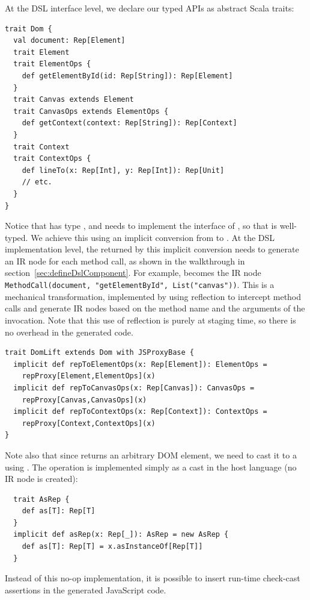 \documentclass[runningheads,a4paper]{llncs}
\begin{document}
At the DSL interface level, we declare our typed APIs as abstract
Scala traits:
\begin{lstlisting}
trait Dom {
  val document: Rep[Element]
  trait Element
  trait ElementOps {
    def getElementById(id: Rep[String]): Rep[Element]
  }
  trait Canvas extends Element
  trait CanvasOps extends ElementOps {
    def getContext(context: Rep[String]): Rep[Context]
  }
  trait Context
  trait ContextOps {
    def lineTo(x: Rep[Int], y: Rep[Int]): Rep[Unit]
    // etc.
  }
}
\end{lstlisting}

Notice that  has type , and needs to
implement the interface of , so that
 is well-typed. We achieve
this using an implicit conversion from  to
.  At the DSL implementation level, the 
returned by this implicit conversion needs to generate an IR node for
each method call, as shown in the walkthrough
in section~\ref{sec:defineDslComponent}. For example,
 becomes the IR node {\tt\small
  MethodCall(document, "getElementById", List("canvas"))}. This is a
mechanical transformation, implemented by  using
reflection to intercept method calls and generate IR nodes based on
the method name and the arguments of the invocation. Note that this
use of reflection is purely at staging time, so there is no overhead
in the generated code.
\begin{lstlisting}
trait DomLift extends Dom with JSProxyBase {
  implicit def repToElementOps(x: Rep[Element]): ElementOps =
    repProxy[Element,ElementOps](x)
  implicit def repToCanvasOps(x: Rep[Canvas]): CanvasOps =
    repProxy[Canvas,CanvasOps](x)
  implicit def repToContextOps(x: Rep[Context]): ContextOps =
    repProxy[Context,ContextOps](x)
}
\end{lstlisting}

Note also that since  returns an arbitrary DOM
element, we need to cast it to a  using
. The  operation is implemented simply as a cast in the
host language (no IR node is created):
\begin{lstlisting}
  trait AsRep {
    def as[T]: Rep[T]
  }
  implicit def asRep(x: Rep[_]): AsRep = new AsRep {
    def as[T]: Rep[T] = x.asInstanceOf[Rep[T]]
  }
\end{lstlisting}
Instead of this no-op implementation, it is possible to insert
run-time check-cast assertions in the generated JavaScript code.
\end{document}
